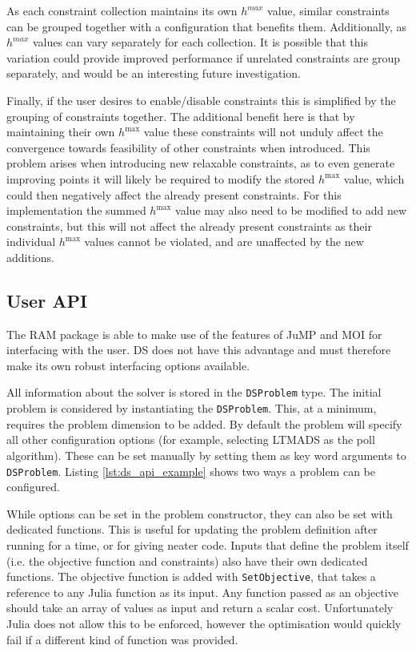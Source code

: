 As each constraint collection maintains its own $h^{max}$ value, similar constraints can be grouped together with a configuration that benefits them. Additionally, as $h^{max}$ values can vary separately for each collection. It is possible that this variation could provide improved performance if unrelated constraints are group separately, and would be an interesting future investigation.

Finally, if the user desires to enable/disable constraints this is simplified by the grouping of constraints together. The additional benefit here is that by maintaining their own $h^{\max}$ value these constraints will not unduly affect the convergence towards feasibility of other constraints when introduced. This problem arises when introducing new relaxable constraints, as to even generate improving points it will likely be required to modify the stored $h^{\max}$ value, which could then negatively affect the already present constraints. For this implementation the summed $h^{\max}$ value may also need to be modified to add new constraints, but this will not affect the already present constraints as their individual $h^{\max}$ values cannot be violated, and are unaffected by the new additions.

\subsection{User API}
The RAM package is able to make use of the features of JuMP and MOI for interfacing with the user. DS does not have this advantage and must therefore make its own robust interfacing options available. 

All information about the solver is stored in the \texttt{DSProblem} type. The initial problem is considered by instantiating the \texttt{DSProblem}. This, at a minimum, requires the problem dimension to be added. By default the problem will specify all other configuration options (for example, selecting LTMADS as the poll algorithm). These can be set manually by setting them as key word arguments to \texttt{DSProblem}. Listing \ref{lst:ds_api_example} shows two ways a problem can be configured.



While options can be set in the problem constructor, they can also be set with dedicated functions. This is useful for updating the problem definition after running for a time, or for giving neater code. Inputs that define the problem itself (i.e. the objective function and constraints) also have their own dedicated functions. The objective function is added with \texttt{SetObjective}, that takes a reference to any Julia function as its input. Any function passed as an objective should take an array of values as input and return a scalar cost. Unfortunately Julia does not allow this to be enforced, however the optimisation would quickly fail if a different kind of function was provided.


